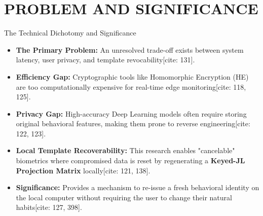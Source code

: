 
\section{PROBLEM AND SIGNIFICANCE}

\begin{frame}{The Technical Dichotomy and Significance}
    \begin{itemize}
        \item \textbf{The Primary Problem:} An unresolved trade-off exists between system latency, user privacy, and template revocability[cite: 131].
        \item \textbf{Efficiency Gap:} Cryptographic tools like Homomorphic Encryption (HE) are too computationally expensive for real-time edge monitoring[cite: 118, 125].
        \item \textbf{Privacy Gap:} High-accuracy Deep Learning models often require storing original behavioral features, making them prone to reverse engineering[cite: 122, 123].
        \item \textbf{Local Template Recoverability:} This research enables "cancelable" biometrics where compromised data is reset by regenerating a \textbf{Keyed-JL Projection Matrix} locally[cite: 121, 138].
        \item \textbf{Significance:} Provides a mechanism to re-issue a fresh behavioral identity on the local computer without requiring the user to change their natural habits[cite: 127, 398].
    \end{itemize}
\end{frame}